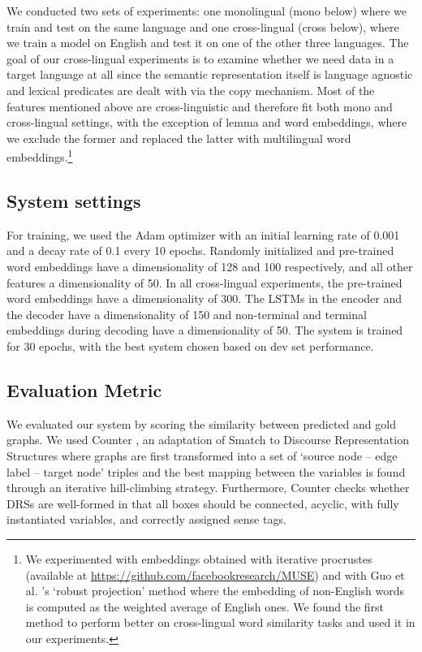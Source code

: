\documentclass[11pt,a4paper]{article}
\theoremstyle{plain}
\begin{document}
We conducted two sets of experiments: one monolingual ({mono} below)
where we train and test on the same language and one cross-lingual
({cross} below), where we train a model on English and test it on one
of the other three languages. The goal of our cross-lingual
experiments is to examine whether we need data in a target language at
all since the semantic representation itself is language agnostic and
lexical predicates are dealt with via the copy mechanism. Most of the
features mentioned above are cross-linguistic and therefore fit both
mono and cross-lingual settings, with the exception of lemma and word
embeddings, where we exclude the former and replaced the latter with
multilingual word embeddings.\footnote{We experimented with embeddings
  obtained with iterative procrustes (available at
  \url{https://github.com/facebookresearch/MUSE}) and with Guo et
  al. 's `robust projection' method
  where the embedding of non-English words is computed as the weighted
  average of English ones. We found the first method to perform better
  on cross-lingual word similarity tasks and used it in our
  experiments.}
  
\subsection{System settings}
For training, we used the Adam optimizer \cite{kingma2014adam} with an initial learning rate of 0.001 and a decay rate of 0.1 every 10 epochs. Randomly initialized and pre-trained word embeddings have a dimensionality of 128 and 100 respectively, and all other features a dimensionality of 50. In all cross-lingual experiments, the pre-trained word embeddings have a dimensionality of 300. The LSTMs in the encoder and the decoder have a dimensionality of 150 and non-terminal and terminal embeddings during decoding have a dimensionality of 50. The system is trained for 30 epochs, with the best system chosen based on dev set performance.

\subsection{Evaluation Metric} \label{evaluation}

We evaluated our system by scoring the similarity between predicted
and gold graphs. We used Counter \citep{van2018exploring}, an
adaptation of Smatch \citep{cai2013smatch} to Discourse Representation
Structures where graphs are first transformed into a set of `source
node -- edge label -- target node' triples and the best mapping
between the variables is found through an iterative hill-climbing
strategy. Furthermore, Counter checks whether DRSs are well-formed in
that all boxes should be connected, acyclic, with fully instantiated
variables, and correctly assigned sense tags.
\end{document}
